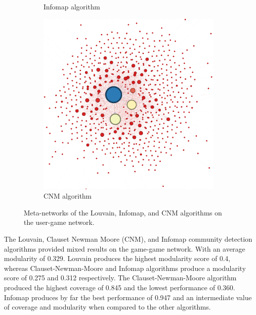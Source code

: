 \begin{figure}[h]
\begin{subfigure}{0.3\linewidth}
        \caption{Infomap algorithm}
        \label{fig:figure2}
    \end{subfigure}
    \hspace{0.04\linewidth}
    \begin{subfigure}{0.3\linewidth}
        \centering
        \includegraphics[width=\linewidth]{images/cnm_communities_num_games.png}
        \caption{CNM algorithm}
        \label{fig:figure2}
    \end{subfigure}
    \caption{Meta-networks of the Louvain, Infomap, and CNM algorithms on the user-game network.}
    \label{fig:figures}
\end{figure}

The Louvain, Clauset Newman Moore (CNM), and Infomap community detection algorithms provided mixed results on the game-game network. With an average modularity of 0.329. Louvain produces the highest modularity score of 0.4, whereas Clauset-Newman-Moore and Infomap algorithms produce a modularity score of 0.275 and 0.312 respectively. The Clauset-Newman-Moore algorithm produced the highest coverage of 0.845 and the lowest performance of 0.360. Infomap produces by far the best performance of 0.947 and an intermediate value of coverage and modularity when compared to the other algorithms.


